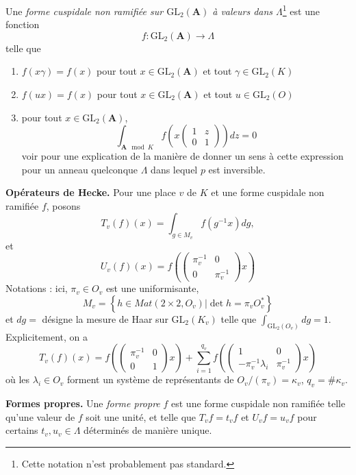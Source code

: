 \begin{definition}
\label{definition-unramified}
Une {\it forme cuspidale non ramifiée sur $\text{GL}_2(\mathbf{A})$ à valeurs dans
$\Lambda$}\footnote{Cette notation n'est probablement pas standard.}
est une fonction
$$
f : \text{GL}_2(\mathbf{A}) \to \Lambda
$$
telle que
\begin{enumerate}
\item $f(x\gamma) = f(x)$ pour tout $x\in \text{GL}_2(\mathbf{A})$ et tout
$\gamma\in \text{GL}_2(K)$
\item $f(ux) = f(x)$ pour tout $x\in \text{GL}_2(\mathbf{A})$ et tout
$u\in \text{GL}_2(O)$
\item pour tout $x\in \text{GL}_2(\mathbf{A})$,
$$
\int_{\mathbf{A} \mod K} f
\left(x
\left(
\begin{matrix}
1 & z \\
0 & 1
\end{matrix}
\right)
\right) dz = 0
$$
voir \cite[section 4.1]{dJ-conjecture}
pour une explication de la manière de donner un sens à cette expression
pour un anneau quelconque $\Lambda$ dans lequel $p$ est inversible.
\end{enumerate}
\end{definition}

\noindent
{\bf Opérateurs de Hecke.}
Pour une place $v$ de $K$ et une forme cuspidale non ramifiée $f$, posons
$$
T_v(f)(x) =
\int_{g\in M_v}f(g^{-1}x)dg,
$$
et
$$
U_v(f)(x) =
f\left(
\left(
\begin{matrix}
\pi_v^{-1} & 0 \\
0 & \pi_v^{-1}
\end{matrix}
\right)x\right)
$$
Notations : ici, $\pi_v \in O_v$ est une uniformisante,
$$
M_v =
\left\{
h\in Mat(2\times 2, O_v) | \det h = \pi_vO_v^*\right\}
$$
et $dg = $ désigne la mesure de Haar sur $\text{GL}_2(K_v)$ telle que
$\int_{\text{GL}_2(O_v)} dg = 1$. Explicitement, on a
$$
T_v(f)(x) =
f\left(
\left(
\begin{matrix}
\pi_v^{-1}& 0 \\
0 & 1
\end{matrix}
\right)
x\right) +
\sum_{i = 1}^{q_v}
f\left(\left(
\begin{matrix}
1 & 0 \\
-\pi_v^{-1}\lambda_i
& \pi_v^{-1}
\end{matrix}
\right) x\right)
$$
où les $\lambda_i\in O_v$ forment un système de représentants de
$O_v/(\pi_v)=\kappa_v$, $q_v = \#\kappa_v$.

\medskip\noindent
{\bf Formes propres.} Une {\it forme propre} $f$ est une forme cuspidale non ramifiée
telle qu'une valeur de $f$ soit une unité, et telle que $T_vf = t_vf$ et
$U_vf = u_vf$ pour certains $t_v, u_v \in \Lambda$ déterminés de manière unique.

